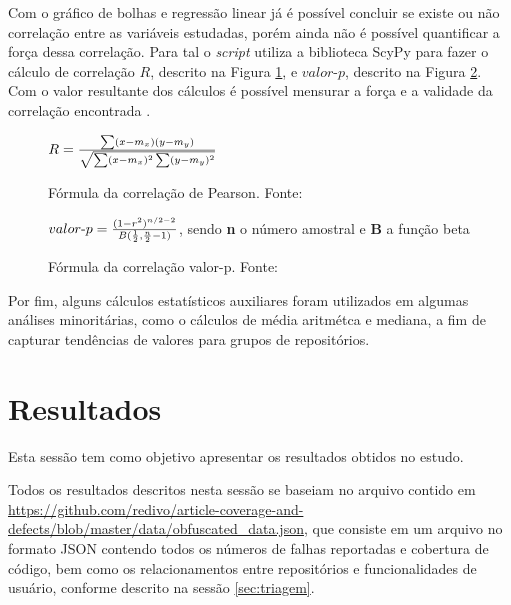 \documentclass[11.5pt]{article}
\begin{document}
Com o gráfico de bolhas e regressão linear já é possível concluir se existe ou não correlação entre
as variáveis estudadas, porém ainda não é possível quantificar a força dessa correlação.
Para tal o \textit{script} utiliza a biblioteca ScyPy
\cite{scipy} para fazer o cálculo de correlação $R$, descrito na Figura \ref{fig:formulaCorrelacao},
e $valor\mbox{-}p$, descrito na Figura \ref{fig:formulaValorP}.
Com o valor resultante dos cálculos é possível mensurar a força e a validade da correlação encontrada
\cite{openIntroStat}.

\begin{figure}[ht]
\caption{Fórmula da correlação de Pearson. Fonte: \cite{scipy}}
\label{fig:formulaCorrelacao}
\begin{center}
    $R = {\sum(x - m_x)(y - m_y) \over \sqrt{\sum(x - m_x)^2 \sum(y - m_y)^2}}$
\end{center}
\end{figure}

\begin{figure}[ht]
\caption{Fórmula da correlação valor-p. Fonte: \cite{scipy}}
\label{fig:formulaValorP}
\begin{center}
    $valor\mbox{-}p = { (1 - r^2)^{n/2-2} \over B({1 \over 2}, {n \over 2} - 1) }$,
    sendo \textbf{n} o número amostral e \textbf{B} a função beta
\end{center}
\end{figure}

Por fim, alguns cálculos estatísticos auxiliares foram utilizados em algumas análises minoritárias,
como o cálculos de média aritmétca e mediana, a fim de capturar
tendências de valores para grupos de repositórios.




\section{Resultados} \label{sec:resultados}

Esta sessão tem como objetivo apresentar os resultados obtidos no estudo.

Todos os resultados descritos nesta sessão se baseiam no arquivo contido em
\url{https://github.com/redivo/article-coverage-and-defects/blob/master/data/obfuscated_data.json},
que consiste em um arquivo no formato JSON contendo todos os números de
falhas reportadas e cobertura de código, bem como os relacionamentos entre repositórios e
funcionalidades de usuário, conforme descrito na sessão \ref{sec:triagem}.
\end{document}
